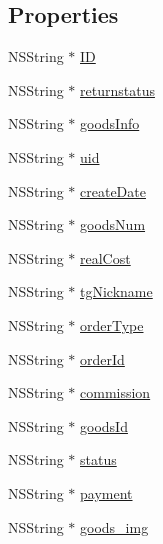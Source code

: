 \subsection*{Properties}
\begin{DoxyCompactItemize}
\item 
N\+S\+String $\ast$ \mbox{\hyperlink{interface_p_p_morder_a679e321221ce050749691f1e07be3127}{ID}}
\item 
N\+S\+String $\ast$ \mbox{\hyperlink{interface_p_p_morder_aace4311ef95b996855e2ed3fd3c082e0}{returnstatus}}
\item 
N\+S\+String $\ast$ \mbox{\hyperlink{interface_p_p_morder_a8c078c5b3734090a298c04aaff93f770}{goods\+Info}}
\item 
N\+S\+String $\ast$ \mbox{\hyperlink{interface_p_p_morder_acb65795ce8dd1b439f05bd1adecbf0c1}{uid}}
\item 
N\+S\+String $\ast$ \mbox{\hyperlink{interface_p_p_morder_ac8c2e4f1d471d6772e4ba303bc588827}{create\+Date}}
\item 
N\+S\+String $\ast$ \mbox{\hyperlink{interface_p_p_morder_a4855cecaa7f178f5d75db8d27cbe3d4a}{goods\+Num}}
\item 
N\+S\+String $\ast$ \mbox{\hyperlink{interface_p_p_morder_a561337ca38927c3017a91208585cee47}{real\+Cost}}
\item 
N\+S\+String $\ast$ \mbox{\hyperlink{interface_p_p_morder_a161bd8e3f684569d08bb19500311cd13}{tg\+Nickname}}
\item 
N\+S\+String $\ast$ \mbox{\hyperlink{interface_p_p_morder_a4039fa91b64987054ba545db9ff76aac}{order\+Type}}
\item 
N\+S\+String $\ast$ \mbox{\hyperlink{interface_p_p_morder_a31e3d173a1388ca15e771d098a37e4f1}{order\+Id}}
\item 
N\+S\+String $\ast$ \mbox{\hyperlink{interface_p_p_morder_a10a054ace42b41c93fb6f3ff8e8b1a25}{commission}}
\item 
N\+S\+String $\ast$ \mbox{\hyperlink{interface_p_p_morder_ada1897b3acd3626e9b4dbb99d2dd3f09}{goods\+Id}}
\item 
N\+S\+String $\ast$ \mbox{\hyperlink{interface_p_p_morder_a6f5c5879b0fb390f61186e8aeecf9f02}{status}}
\item 
N\+S\+String $\ast$ \mbox{\hyperlink{interface_p_p_morder_aba90d0fae45c49cc989957aa4ec951d4}{payment}}
\item 
N\+S\+String $\ast$ \mbox{\hyperlink{interface_p_p_morder_a07b880d9de70cbb36c24d9afcc27e371}{goods\+\_\+img}}
\end{DoxyCompactItemize}


